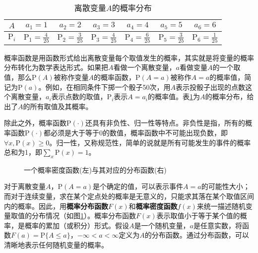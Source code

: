 \begin{table}[htp]
\centering
\caption{离散变量$A$的概率分布}
\begin{tabular}{c|c c c c c c}
\rule{0pt}{15pt}     $A$ & $a_1=1$ & $a_2=2$ & $a_3=3$ & $a_4=4$ & $a_5=5$ & $a_6=6$\\
               \hline
\rule{0pt}{15pt}     $\textrm{P}_i$ & $\textrm{P}_1=\frac{4}{25}$  &  $\textrm{P}_2=\frac{3}{25}$ &  $\textrm{P}_3=\frac{4}{25}$ & $\textrm{P}_4=\frac{6}{25}$ & $\textrm{P}_5=\frac{3}{25}$ & $\textrm{P}_6=\frac{1}{25}$  \\
             \end{tabular}
             \label{tab:2-1}
\end{table}

\parinterval 概率函数是用函数形式给出离散变量每个取值发生的概率，其实就是将变量的概率分布转化为数学表达形式。如果把$A$看做一个离散变量，$a$看做变量$A$的一个取值，那么$\textrm{P}(A)$被称作变量$A$的概率函数，$\textrm{P}(A=a)$被称作$A = a$的概率值，简记为$\textrm{P}(a)$。例如，在相同条件下掷一个骰子50次，用$A$表示投骰子出现的点数这个离散变量，$a_i$表示点数的取值，$\textrm{P}_i$表示$A=a_i$的概率值。表\ref{tab:2-1}为$A$的概率分布，给出了$A$的所有取值及其概率。

\parinterval 除此之外，概率函数$\textrm{P}(\cdot)$还具有非负性、归一性等特点。非负性是指，所有的概率函数$\textrm{P}(\cdot)$都必须是大于等于0的数值，概率函数中不可能出现负数，即$\forall{x},\textrm{P}{(x)}\geq{0}$。归一性，又称规范性，简单的说就是所有可能发生的事件的概率总和为1，即$\sum_{x}\textrm{P}{(x)}={1}$。

\begin{figure}[htp]
\centering
 
\caption{一个概率密度函数(左)与其对应的分布函数(右)}
\label{fig:2-3}
\end{figure}

\parinterval 对于离散变量$A$，$\textrm{P}(A=a)$是个确定的值，可以表示事件$A=a$的可能性大小；而对于连续变量，求在某个定点处的概率是无意义的，只能求其落在某个取值区间内的概率。因此，用{\small\sffamily\bfseries{概率分布函数}}$F(x)$和{\small\sffamily\bfseries{概率密度函数}}$f(x)$来统一描述随机变量取值的分布情况（如图\ref{fig:2-3}）。概率分布函数$F(x)$表示取值小于等于某个值的概率，是概率的累加（或积分）形式。假设$A$是一个随机变量，$a$是任意实数，将函数$F(a)=\textrm{P}\{A\leq a\}$，$-\infty<a<\infty $定义为$A$的分布函数。通过分布函数，可以清晰地表示任何随机变量的概率。

